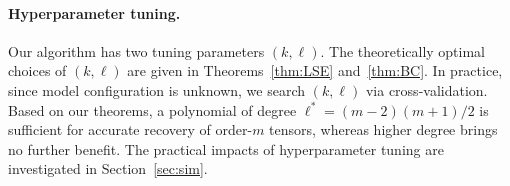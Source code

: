 \documentclass[12pt]{article}
\theoremstyle{definition}
\begin{document}

{\color{blue}\paragraph{Hyperparameter tuning.}
Our algorithm has two tuning parameters $(k,\ell)$. The theoretically optimal choices of $(k,\ell)$ are given in Theorems~\ref{thm:LSE} and~\ref{thm:BC}. In practice, since model configuration is unknown, we search $(k,\ell)$ via cross-validation. 
Based on our theorems, a polynomial of degree $\ell^*=(m-2)(m+1)/2$ is sufficient for accurate recovery of order-$m$ tensors, whereas higher degree brings no further benefit. The practical impacts of hyperparameter tuning are investigated in Section~\ref{sec:sim}. }
\end{document}
